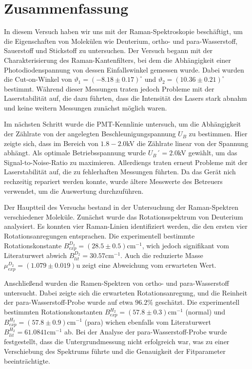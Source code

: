 \section{Zusammenfassung}
In diesem Versuch haben wir uns mit der Raman-Spektroskopie beschäftigt, um die Eigenschaften von Molekülen wie Deuterium, ortho- und para-Wasserstoff, Sauerstoff und Stickstoff zu untersuchen.
Der Versuch begann mit der Charakterisierung des Raman-Kantenfilters, bei dem die Abhängigkeit einer Photodiodenspannung von dessen Einfallswinkel gemessen wurde. Dabei wurden die Cut-on-Winkel von $\vartheta_1 = \left(-8.18\pm 0.17\right)^\circ$ und $\vartheta_2 =\left(10.36\pm 0.21\right)^\circ$ bestimmt. 
Während dieser Messungen traten jedoch Probleme mit der Laserstabilität auf, die dazu führten, dass die Intensität des Lasers stark abnahm und keine weitern Messungen zun\"achst möglich waren. %

Im nächsten Schritt wurde die PMT-Kennlinie untersuch, um die Abhängigkeit der Zählrate von der angelegten Beschleunigungspannung $U_B$ zu bestimmen. Hier zeigte sich, dass im Bereich von $1.8-2.0$kV die Zählrate linear von der Spannung abhängt. Als optimale Betriebsspannung wurde $U_B´=2.0$kV gewählt, um das Signal-to-Noise-Ratio zu maximieren. Allerdiengs traten erneut Probleme mit der Laserstabilität auf, die zu fehlerhaften Messungen führten. Da das Gerät nich rechzeitig repariert werden konnte, wurde ältere Messwerte des Betreuers verwendet, um die Auswertung durchzuführen.

Der Hauptteil des Versuchs bestand in der Untersuchung der Raman-Spektren verschiedener Moleküle. Zunächst wurde das Rotationsspektrum von Deuterium analysiert. Es konnten vier Raman-Linien identifiziert werden, die den ersten vier Rotationsanregungen entsprachen. Die experimentell bestimmte Rotationskonstante $B_{exp}^{D_2} = \left(28.5\pm 0.5\right)\mathrm{cm}^{-1}$, wich jedoch signifikant vom Literaturwert abwich $B_{lit}^{D_2} = 30.57\mathrm{cm}^{-1}$. Auch die reduzierte Masse $\mu_{exp}^{D_2} = \left(1.079\pm0.019\right)$u zeigt eine Abweichung vom erwarteten Wert.

Anschlie{\ss}end wurden die Ramen-Spektren von ortho- und para-Wasserstoff untersucht. Dabei zeigte sich die erwarteten Rotationsanregung, und die Reinheit der para-Wasserstoff-Probe wurde auf etwa $96.2\%$ gesch\"atzt. Die experimentell bestimmten Rotationskonstanten $B_{exp}^{H_2} = \left(57.8\pm0.3\right)\mathrm{cm}^{-1}$ (normal) und $B_{exp}^{H_2} = \left(57.8\pm0.9\right)\mathrm{cm}^{-1}$ (para) wichen ebenfalls vom Literaturwert $B_{lit}^{H_2} = 61.0841\mathrm{cm}^{-1}$ ab. Bei der Analyse der para-Wasserstoff-Probe wurde festgestellt, dass die Untergrundmessung nicht erfolgreich war, was zu einer Verschiebung des Spektrums f\"uhrte und die Genauigkeit der Fitparameter beeintr\"achtigte.

